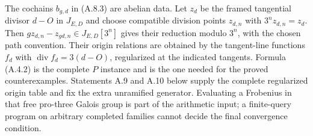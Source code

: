 The cochains $b_{g,d}$ in (A.8.3) are abelian data. Let $z_d$ be
the framed tangential divisor $d-O$ in $J_{E,D}$ and choose
compatible division points $z_{d,n}$ with $3^nz_{d,n}=z_d$.
Then $g z_{d,n}-z_{gd,n}\in J_{E,D}[3^n]$ gives their reduction
modulo $3^n$, with the chosen path convention. Their origin
relations are obtained by the tangent-line functions $f_d$ with
$\operatorname{div}f_d=3(d-O)$, regularized at the indicated
tangents. Formula (A.4.2) is the complete $P$ instance and is the
one needed for the proved counterexamples. Statements A.9 and A.10 below supply the complete regularized
origin table and fix the extra unramified generator. Evaluating a
Frobenius in that free pro-three Galois group is part of the
arithmetic input; a finite-query program on arbitrary completed
families cannot decide the final convergence condition.


